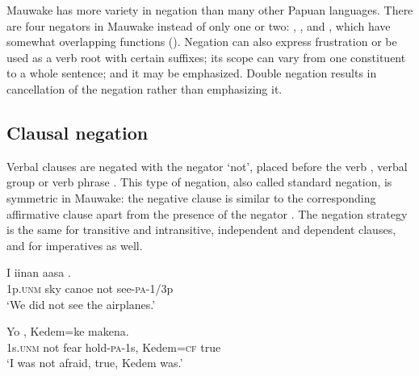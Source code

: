 Mauwake has more variety in negation than many other Papuan languages.
There are four negators in Mauwake instead of only one or two: , ,  and , which have somewhat overlapping functions (). Negation can also express frustration or be used as a verb root with certain suffixes; its scope can vary from one constituent to a whole sentence; and it may be emphasized. Double negation results in cancellation of the negation rather than emphasizing it. 

\subsection{Clausal negation} \label{sec:6.2.1}

Verbal clauses are negated with the negator  `not', placed before the verb , verbal group  or verb phrase . 
This type of negation, also called standard negation, is symmetric in Mauwake: the negative clause is similar to the corresponding affirmative clause apart from the presence of the negator \citep[61--67]{Miestamo2005}. The negation strategy is the same for transitive and intransitive, independent and dependent clauses, and for imperatives as well. 

\ea%
\label{ex:6:x1090}
\gll I  iinan  aasa    . \\
1p.\textsc{unm}  sky  canoe  not  see-\textsc{pa}-1/3p\\
\glt `We did not see the airplanes.'
\z

\ea%
\label{ex:6:x1091}
\gll Yo      ,  Kedem=ke  makena. \\
1s.\textsc{unm}  not  fear  hold-\textsc{pa}-1s,  Kedem=\textsc{cf}  true\\
\glt `I was not afraid, true, Kedem was.'
\z


